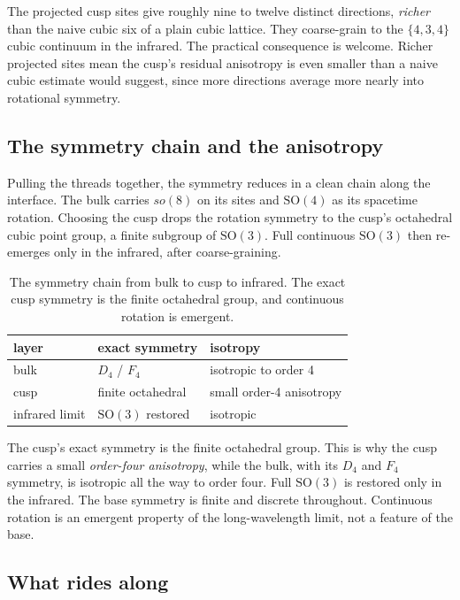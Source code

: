 The projected cusp sites give roughly nine to twelve distinct directions, \emph{richer} than the naive cubic six of a plain cubic lattice. They coarse-grain to the $\{4,3,4\}$ cubic continuum in the infrared. The practical consequence is welcome. Richer projected sites mean the cusp's residual anisotropy is even smaller than a naive cubic estimate would suggest, since more directions average more nearly into rotational symmetry.

\subsection{The symmetry chain and the anisotropy}

Pulling the threads together, the symmetry reduces in a clean chain along the interface. The bulk carries $so(8)$ on its sites and $\mathrm{SO}(4)$ as its spacetime rotation. Choosing the cusp drops the rotation symmetry to the cusp's octahedral cubic point group, a finite subgroup of $\mathrm{SO}(3)$. Full continuous $\mathrm{SO}(3)$ then re-emerges only in the infrared, after coarse-graining.

\begin{table}[ht]
\centering
\begin{tabular}{@{}lll@{}}
\toprule
layer & exact symmetry & isotropy \\
\midrule
bulk & $D_4$ / $F_4$ & isotropic to order 4 \\
cusp & finite octahedral & small order-4 anisotropy \\
infrared limit & $\mathrm{SO}(3)$ restored & isotropic \\
\bottomrule
\end{tabular}
\caption{The symmetry chain from bulk to cusp to infrared. The exact cusp symmetry is the finite octahedral group, and continuous rotation is emergent.}
\label{tab:symmetry-chain}
\end{table}

The cusp's exact symmetry is the finite octahedral group. This is why the cusp carries a small \emph{order-four anisotropy}, while the bulk, with its $D_4$ and $F_4$ symmetry, is isotropic all the way to order four. Full $\mathrm{SO}(3)$ is restored only in the infrared. The base symmetry is finite and discrete throughout. Continuous rotation is an emergent property of the long-wavelength limit, not a feature of the base.

\subsection{What rides along}

